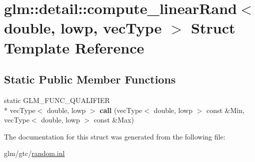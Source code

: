 \hypertarget{structglm_1_1detail_1_1compute__linearRand_3_01double_00_01lowp_00_01vecType_01_4}{\section{glm\-:\-:detail\-:\-:compute\-\_\-linear\-Rand$<$ double, lowp, vec\-Type $>$ Struct Template Reference}
\label{structglm_1_1detail_1_1compute__linearRand_3_01double_00_01lowp_00_01vecType_01_4}
}
\subsection*{Static Public Member Functions}
\begin{DoxyCompactItemize}
\item 
\hypertarget{structglm_1_1detail_1_1compute__linearRand_3_01double_00_01lowp_00_01vecType_01_4_a87f42da70174985a5b6c772a0b540818}{static G\-L\-M\-\_\-\-F\-U\-N\-C\-\_\-\-Q\-U\-A\-L\-I\-F\-I\-E\-R \\*
vec\-Type$<$ double, lowp $>$ {\bfseries call} (vec\-Type$<$ double, lowp $>$ const \&Min, vec\-Type$<$ double, lowp $>$ const \&Max)}\label{structglm_1_1detail_1_1compute__linearRand_3_01double_00_01lowp_00_01vecType_01_4_a87f42da70174985a5b6c772a0b540818}

\end{DoxyCompactItemize}


The documentation for this struct was generated from the following file\-:\begin{DoxyCompactItemize}
\item 
glm/gtc/\hyperlink{random_8inl}{random.\-inl}\end{DoxyCompactItemize}
